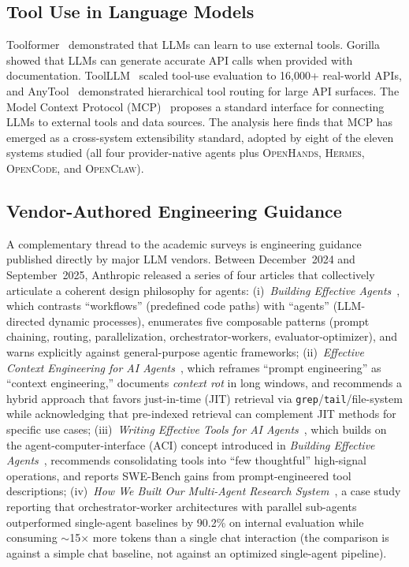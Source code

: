 \documentclass[11pt,a4paper]{article}
\newcommand{\oh}{\textsc{OpenHands}\xspace}
\newcommand{\ocl}{\textsc{OpenClaw}\xspace}
\newcommand{\hrm}{\textsc{Hermes}\xspace}
\newcommand{\ocd}{\textsc{OpenCode}\xspace}
\begin{document}
\subsection{Tool Use in Language Models}

Toolformer~\cite{schick2023toolformer} demonstrated that LLMs can learn to use external tools.
Gorilla~\cite{patil2023gorilla} showed that LLMs can generate accurate API calls when provided with documentation.
ToolLLM~\cite{qin2024toolllm} scaled tool-use evaluation to 16,000+ real-world APIs, and AnyTool~\cite{du2024anytool} demonstrated hierarchical tool routing for large API surfaces.
The Model Context Protocol (MCP)~\cite{mcp2024} proposes a standard interface for connecting LLMs to external tools and data sources.
The analysis here finds that MCP has emerged as a cross-system extensibility standard, adopted by eight of the eleven systems studied (all four provider-native agents plus \oh{}, \hrm{}, \ocd{}, and \ocl{}).

\subsection{Vendor-Authored Engineering Guidance}
\label{sec:bg_anthropic_series}

A complementary thread to the academic surveys is engineering guidance published directly by major LLM vendors.
Between December~2024 and September~2025, Anthropic released a series of four articles that collectively articulate a coherent design philosophy for agents:
(i)~\emph{Building Effective Agents}~\cite{schluntz2024agents}, which contrasts ``workflows'' (predefined code paths) with ``agents'' (LLM-directed dynamic processes), enumerates five composable patterns (prompt chaining, routing, parallelization, orchestrator-workers, evaluator-optimizer), and warns explicitly against general-purpose agentic frameworks;
(ii)~\emph{Effective Context Engineering for AI Agents}~\cite{rajasekaran2025context}, which reframes ``prompt engineering'' as ``context engineering,'' documents \emph{context rot} in long windows, and recommends a hybrid approach that favors just-in-time (JIT) retrieval via \texttt{grep}/\texttt{tail}/file-system while acknowledging that pre-indexed retrieval can complement JIT methods for specific use cases;
(iii)~\emph{Writing Effective Tools for AI Agents}~\cite{aizawa2025tools}, which builds on the agent-computer-interface (ACI) concept introduced in \emph{Building Effective Agents}~\cite{schluntz2024agents}, recommends consolidating tools into ``few thoughtful'' high-signal operations, and reports SWE-Bench gains from prompt-engineered tool descriptions;
(iv)~\emph{How We Built Our Multi-Agent Research System}~\cite{hadfield2025multiagent}, a case study reporting that orchestrator-worker architectures with parallel sub-agents outperformed single-agent baselines by 90.2\% on internal evaluation while consuming $\sim$15$\times$ more tokens than a single chat interaction (the comparison is against a simple chat baseline, not against an optimized single-agent pipeline).
\end{document}

